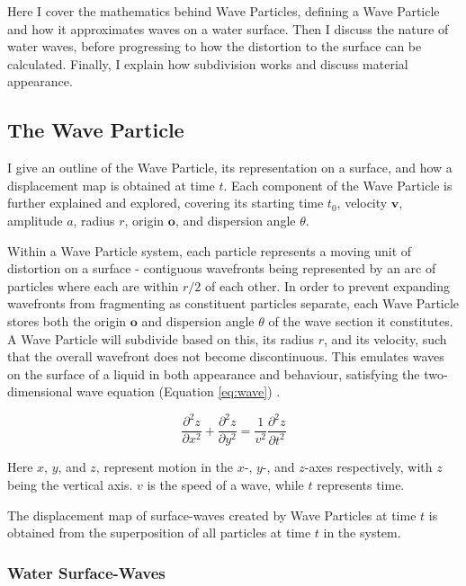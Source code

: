 \documentclass[12pt,a4paper,twoside]{report}
\begin{document}
Here I cover the mathematics behind Wave Particles, defining a Wave Particle
and how it approximates waves on a water surface. Then I discuss the nature of
water waves, before progressing to how the distortion to the surface can be
calculated. Finally, I explain how subdivision works and discuss material
appearance.

\subsection{The Wave Particle}

\label{sec:wave_particle}

I give an outline of the Wave Particle, its representation on a surface, and
how a displacement map is obtained at time $t$. Each component of the Wave
Particle is further explained and explored, covering its starting time $t_0$,
velocity $\bm{v}$, amplitude $a$, radius $r$, origin $\bm{o}$, and dispersion
angle $\theta$.

Within a Wave Particle system, each particle represents a moving unit of
distortion on a surface - contiguous wavefronts being represented by an arc of
particles where each are within $r/2$ of each other. In order to prevent
expanding wavefronts from fragmenting as constituent particles separate, each
Wave Particle stores both the origin $\bm{o}$ and dispersion angle $\theta$ of
the wave section it constitutes. A Wave Particle will subdivide based on this,
its radius $r$, and its velocity, such that the overall wavefront does not
become discontinuous. This emulates waves on the surface of a liquid in both
appearance and behaviour, satisfying the two-dimensional wave equation
(Equation \ref{eq:wave}) \cite{Yuksel2007}.

\begin{equation}\label{eq:wave}\frac{\partial ^2 z}{\partial x^2} + \frac{\partial ^2
z}{\partial y^2} = \frac{1}{v^2} \frac{\partial ^2 z}{\partial t^2 }
\end{equation}

Here $x$, $y$, and $z$, represent motion in the $x$-, $y$-, and $z$-axes
respectively, with $z$ being the vertical axis. $v$ is the speed of a wave,
while $t$ represents time.

The displacement map of surface-waves created by Wave Particles at time $t$ is
obtained from the superposition of all particles at time $t$ in the system.

\subsubsection{Water Surface-Waves}
\end{document}
